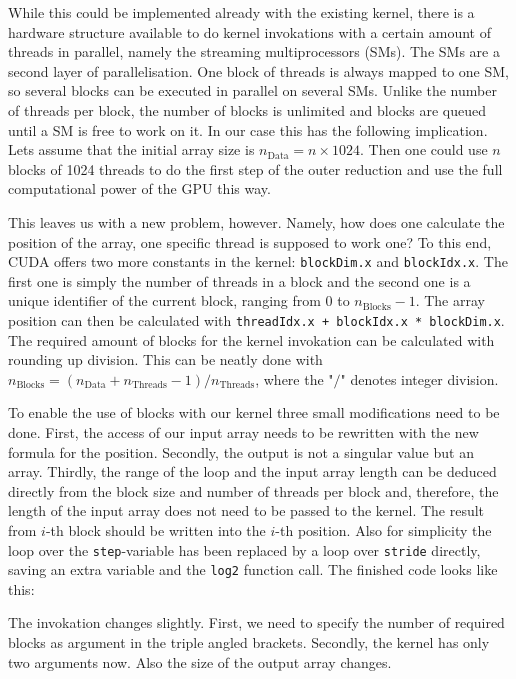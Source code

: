 While this could be implemented already with the existing kernel, there is a hardware structure available to do kernel invokations with a certain amount of threads in parallel, namely the streaming multiprocessors (SMs).
The SMs are a second layer of parallelisation.
One block of threads is always mapped to one SM, so several blocks can be executed in parallel on several SMs.
Unlike the number of threads per block, the number of blocks is unlimited and blocks are queued until a SM is free to work on it.
In our case this has the following implication.
Lets assume that the initial array size is \( n_{\mathrm{Data}} = n \times 1024 \).
Then one could use \( n \) blocks of 1024 threads to do the first step of the outer reduction and use the full computational power of the GPU this way.

This leaves us with a new problem, however.
Namely, how does one calculate the position of the array, one specific thread is supposed to work one?
To this end, CUDA offers two more constants in the kernel:
\texttt{blockDim.x} and \texttt{blockIdx.x}.
The first one is simply the number of threads in a block and the second one is a unique identifier of the current block, ranging from 0 to \( n_{\mathrm{Blocks}} - 1\).
The array position can then be calculated with \texttt{threadIdx.x + blockIdx.x * blockDim.x}.
The required amount of blocks for the kernel invokation can be calculated with rounding up division.
This can be neatly done with \( n_{\mathrm{Blocks}} = (n_{\mathrm{Data}} + n_{\mathrm{Threads}} - 1) / n_{\mathrm{Threads}} \), where the "\( / \)" denotes integer division.

To enable the use of blocks with our kernel three small modifications need to be done.
First, the access of our input array needs to be rewritten with the new formula for the position.
Secondly, the output is not a singular value but an array.
Thirdly, the range of the loop and the input array length can be deduced directly from the block size and number of threads per block and, therefore, the length of the input array does not need to be passed to the kernel.
The result from \(i\)-th block should be written into the \(i\)-th position.
Also for simplicity the loop over the \texttt{step}-variable has been replaced by a loop over \texttt{stride} directly, saving an extra variable and the \texttt{log2} function call.
The finished code looks like this:



The invokation changes slightly.
First, we need to specify the number of required blocks as argument in the triple angled brackets.
Secondly, the kernel has only two arguments now.
Also the size of the output array changes.

